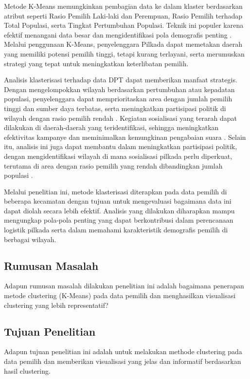 Metode K-Means memungkinkan pembagian data ke dalam klaster berdasarkan atribut seperti Rasio Pemilih Laki-laki dan Perempuan, Rasio Pemilih terhadap Total Populasi, serta Tingkat Pertumbuhan Populasi. Teknik ini populer karena efektif menangani data besar dan mengidentifikasi pola demografis penting \cite{ClusteringMethod}. Melalui penggunaan K-Means, penyelenggara Pilkada dapat memetakan daerah yang memiliki potensi pemilih tinggi, tetapi kurang terlayani, serta merumuskan strategi yang tepat untuk meningkatkan keterlibatan pemilih.

Analisis klasterisasi terhadap data DPT dapat memberikan manfaat strategis. Dengan mengelompokkan wilayah berdasarkan pertumbuhan atau kepadatan populasi, penyelenggara dapat memprioritaskan area dengan jumlah pemilih tinggi dan sumber daya terbatas, serta meningkatkan partisipasi politik di wilayah dengan rasio pemilih rendah \cite{AnalisaCluster}. Kegiatan sosialisasi yang terarah dapat dilakukan di daerah-daerah yang teridentifikasi, sehingga meningkatkan efektivitas kampanye dan meminimalkan kemungkinan pengabaian suara \cite{AnalisisDpt}. Selain itu, analisis ini juga dapat membantu dalam meningkatkan partisipasi politik, dengan mengidentifikasi wilayah di mana sosialisasi pilkada perlu diperkuat, terutama di area dengan rasio pemilih yang rendah dibandingkan jumlah populasi \cite{ElectionParticipation}.

Melalui penelitian ini, metode klasterisasi diterapkan pada data pemilih di beberapa kecamatan dengan tujuan untuk mengevaluasi bagaimana data ini dapat diolah secara lebih efektif. Analisis yang dilakukan diharapkan mampu mengungkap pola-pola penting yang dapat berkontribusi dalam perencanaan logistik pilkada serta dalam memahami karakteristik demografis pemilih di berbagai wilayah.

\subsection{Rumusan Masalah}
Adapun rumusan masalah dilakukan penelitian ini adalah bagaimana penerapan metode clustering (K-Means) pada data pemilih dan menghasilkan visualisasi clustering yang lebih representatif?

\subsection{Tujuan Penelitian}
Adapun tujuan penelitian ini adalah untuk melakukan methode clustering pada data pemilih dan memberikan visualisasi yang jelas dan informatif berdasarkan hasil clustering.

